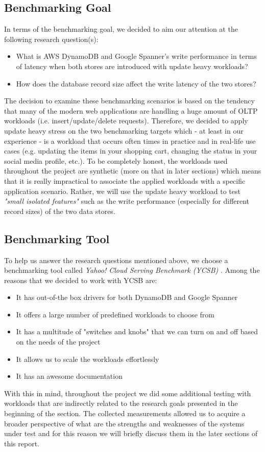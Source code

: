 \documentclass[letterpaper, 10 pt, conference]{ieeeconf}  %
\begin{document}
\subsection{Benchmarking Goal}
In terms of the benchmarking goal, we decided to aim our attention at the following research question(s): 
\begin{itemize}
    \item What is AWS DynamoDB and Google Spanner’s write performance in terms of latency when both stores are introduced with update heavy workloads? 
    \item How does the database record size affect the write latency of the two stores?  
\end{itemize}
The decision to examine these benchmarking scenarios is based on the tendency that many of the modern web applications are handling a huge amount of OLTP workloads (i.e. insert/update/delete requests). Therefore, we decided to apply update heavy stress on the two benchmarking targets which - at least in our experience - is a workload that occurs often times in practice and in real-life use cases (e.g. updating the items in your shopping cart, changing the status in your social media profile, etc.). To be completely honest, the workloads used throughout the project are synthetic (more on that in later sections) which means that it is really impractical to associate the applied workloads with a specific application scenario. Rather, we will use the update heavy workload to test \textit {"small isolated features"} \cite{StefanTaiBook} such as the write performance (especially for different record sizes) of the two data stores.


\subsection{Benchmarking Tool}
To help us answer the research questions mentioned above, we choose a benchmarking tool called \textit{Yahoo! Cloud Serving Benchmark (YCSB)} \cite{Cooper:2010:BCS:1807128.1807152}. Among the reasons that we decided to work with YCSB are:
\begin{itemize}
    \item It has out-of-the box drivers for both DynamoDB and Google Spanner  
    \item It offers a large number of predefined workloads to choose from
    \item It has a multitude of "switches and knobs" that we can turn on and off based on the needs of the project
    \item It allows us to scale the workloads effortlessly
    \item It has an awesome documentation 
\end{itemize}
With this in mind, throughout the project we did some additional testing with workloads that are indirectly related to the research goals presented in the beginning of the section. The collected measurements allowed us to acquire a broader perspective of what are the strengths and weaknesses of the systems under test and for this reason we will briefly discuss them in the later sections of this report.
\end{document}
